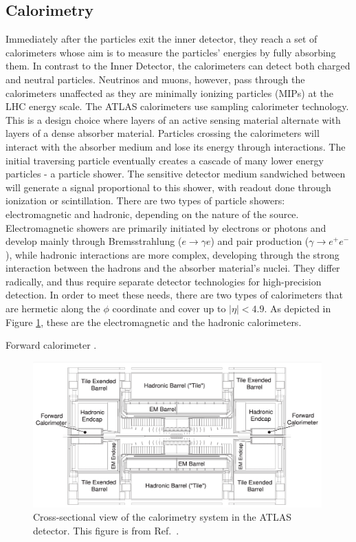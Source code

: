 \subsection{Calorimetry}
Immediately after the particles exit the inner detector, they reach a set of calorimeters whose aim is to measure the particles’ energies by fully absorbing them. In contrast to the Inner Detector, the calorimeters can detect both charged and neutral particles. Neutrinos and muons, however, pass through the calorimeters unaffected as they are minimally ionizing particles (MIPs) at the LHC energy scale. The ATLAS calorimeters use sampling calorimeter technology. This is a design choice where layers of an active sensing material alternate with layers of a dense absorber material. Particles crossing the calorimeters will interact with the absorber medium and lose its energy through interactions. The initial traversing particle eventually creates a cascade of many lower energy particles - a particle shower. The sensitive detector medium sandwiched between will generate a signal proportional to this shower, with readout done through ionization or scintillation. 
There are two types of particle showers: electromagnetic and hadronic, depending on the nature of the source. Electromagnetic showers are primarily initiated by electrons or photons and develop mainly through Bremsstrahlung ($e\rightarrow\gamma e$) and pair production ($\gamma\rightarrow e^+e^-$), while hadronic interactions are more complex, developing through the strong interaction between the hadrons and the absorber material's nuclei. They differ radically, and thus require separate detector technologies for high-precision detection.  In order to meet these needs, there are two types of calorimeters that are hermetic along the $\phi$ coordinate and cover up to $|\eta| < 4.9$. As depicted in Figure \ref{fig:calorimeters}, these are the electromagnetic and the hadronic calorimeters. 

Forward calorimeter \cite{Artamonov_2008}.
\begin{figure}
    \centering
    \includegraphics[width=0.99\textwidth]{Figures/LHC/ATLASCalorimetry.png}
    \caption{Cross-sectional view of the calorimetry system in the ATLAS detector. This figure is from Ref.~\cite{Lampl:923625}.}
    \label{fig:calorimeters}
\end{figure}

